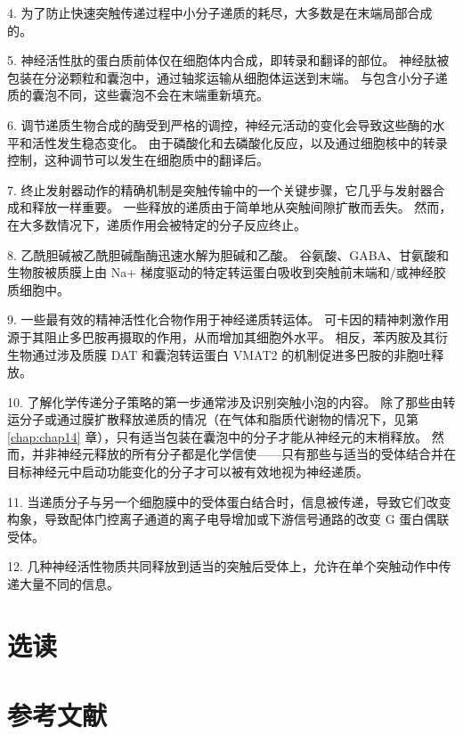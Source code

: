 4. 为了防止快速突触传递过程中小分子递质的耗尽，大多数是在末端局部合成的。 


5. 神经活性肽的蛋白质前体仅在细胞体内合成，即转录和翻译的部位。 
神经肽被包装在分泌颗粒和囊泡中，通过轴浆运输从细胞体运送到末端。
与包含小分子递质的囊泡不同，这些囊泡不会在末端重新填充。 


6. 调节递质生物合成的酶受到严格的调控，神经元活动的变化会导致这些酶的水平和活性发生稳态变化。 
由于磷酸化和去磷酸化反应，以及通过细胞核中的转录控制，这种调节可以发生在细胞质中的翻译后。 


7. 终止发射器动作的精确机制是突触传输中的一个关键步骤，它几乎与发射器合成和释放一样重要。 
一些释放的递质由于简单地从突触间隙扩散而丢失。 
然而，在大多数情况下，递质作用会被特定的分子反应终止。 


8. 乙酰胆碱被乙酰胆碱酯酶迅速水解为胆碱和乙酸。 
谷氨酸、GABA、甘氨酸和生物胺被质膜上由 Na+ 梯度驱动的特定转运蛋白吸收到突触前末端和/或神经胶质细胞中。 


9. 一些最有效的精神活性化合物作用于神经递质转运体。 
可卡因的精神刺激作用源于其阻止多巴胺再摄取的作用，从而增加其细胞外水平。 
相反，苯丙胺及其衍生物通过涉及质膜 DAT 和囊泡转运蛋白 VMAT2 的机制促进多巴胺的非胞吐释放。 


10. 了解化学传递分子策略的第一步通常涉及识别突触小泡的内容。 
除了那些由转运分子或通过膜扩散释放递质的情况（在气体和脂质代谢物的情况下，见第 \ref{chap:chap14} 章），只有适当包装在囊泡中的分子才能从神经元的末梢释放。 
然而，并非神经元释放的所有分子都是化学信使——只有那些与适当的受体结合并在目标神经元中启动功能变化的分子才可以被有效地视为神经递质。 


11. 当递质分子与另一个细胞膜中的受体蛋白结合时，信息被传递，导致它们改变构象，导致配体门控离子通道的离子电导增加或下游信号通路的改变 G 蛋白偶联受体。 


12. 几种神经活性物质共同释放到适当的突触后受体上，允许在单个突触动作中传递大量不同的信息。

\section{选读}

\section{参考文献}